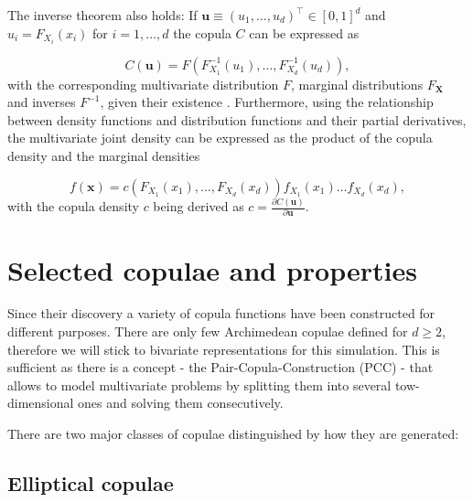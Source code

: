 The inverse theorem also holds: If $\mathbf{u} \equiv \left(u_1,\dots,u_d\right)^{\top} \in [0,1]^{d}$ and $u_i = F_{X_i}(x_i)$ for $i = 1, \dots , d$ the copula $C$ can be expressed as

\begin{equation}
	\label{copula_def}
	C\left(\mathbf{u}\right)=F\left(F_{X_1}^{-1}\left(u_{1}\right), \ldots, F_{X_d}^{-1}\left(u_{d}\right)\right), 
\end{equation}
%
with the corresponding multivariate distribution $F$, marginal distributions $F_{\mathbf{X}}$ and inverses $F^{-1}$, given their existence \citep{durante2013topological}. Furthermore, using the relationship between density functions and distribution functions and their partial derivatives, the multivariate joint density can be expressed as the product of the copula density and the marginal densities

\begin{equation}
	f\left(\mathbf{x}\right)=c\left(F_{X_1}\left(x_{1}\right), \ldots, F_{X_d}\left(x_{d}\right)\right) f_{X_1}\left(x_{1}\right) \ldots f_{X_d}\left(x_{d}\right),
\end{equation}
%
with the copula density $c$ being derived as $c=\frac{\partial C(\mathbf{u})}{\partial \mathbf{u}}$.

\section{Selected copulae and properties}

Since their discovery a variety of copula functions have been constructed for different purposes. There are only few Archimedean copulae defined for $d\geq 2$, therefore we will  stick to bivariate representations for this simulation. This is sufficient as there is a concept - the Pair-Copula-Construction (PCC) - that allows to model multivariate problems by splitting them into several tow-dimensional ones and solving them consecutively. 

There are two major classes of copulae distinguished by how they are generated:


\subsection{Elliptical copulae}

